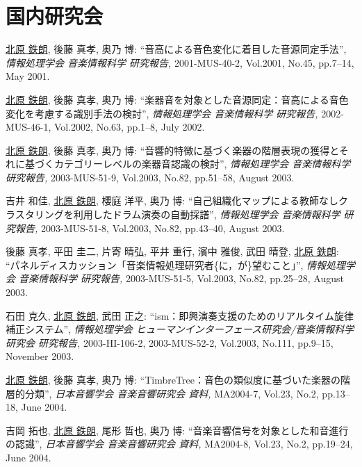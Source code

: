 \section*{国内研究会}
\begin{Enumerate}
  
\item 
\underline{北原 鉄朗}, 
後藤 真孝, 
奥乃 博: 
    ``音高による音色変化に着目した音源同定手法'', 
    {\it 情報処理学会 音楽情報科学 研究報告,} 2001-MUS-40-2, Vol.2001, No.45, pp.7--14, May 2001. 

\item 
\underline{北原 鉄朗}, 
後藤 真孝, 
奥乃 博: 
    ``楽器音を対象とした音源同定：音高による音色変化を考慮する識別手法の検討'', 
    {\it 情報処理学会 音楽情報科学 研究報告,} 2002-MUS-46-1, Vol.2002, No.63, pp.1--8, July 2002. 

\item 
\underline{北原 鉄朗}, 
後藤 真孝, 
奥乃 博: 
    ``音響的特徴に基づく楽器の階層表現の獲得とそれに基づくカテゴリーレベルの楽器音認識の検討'', 
    {\it 情報処理学会 音楽情報科学 研究報告,} 2003-MUS-51-9, Vol.2003, No.82, pp.51--58, August 2003. 

\item 
吉井 和佳, 
\underline{北原 鉄朗}, 
櫻庭 洋平, 
奥乃 博: 
    ``自己組織化マップによる教師なしクラスタリングを利用したドラム演奏の自動採譜'', 
    {\it 情報処理学会 音楽情報科学 研究報告,} 2003-MUS-51-8, Vol.2003, No.82, pp.43--40, August 2003. 

\item 
後藤 真孝, 
平田 圭二, 
片寄 晴弘, 
平井 重行, 
濱中 雅俊, 
武田 晴登, 
\underline{北原 鉄朗}: 
    ``パネルディスカッション「音楽情報処理研究者\{に，が\}望むこと」'', 
    {\it 情報処理学会 音楽情報科学 研究報告,} 2003-MUS-51-5, Vol.2003, No.82, pp.25--28, August 2003. 

\item 
石田 克久, 
\underline{北原 鉄朗}, 
武田 正之: 
    ``ism：即興演奏支援のためのリアルタイム旋律補正システム'', 
    {\it 情報処理学会 ヒューマンインターフェース研究会/音楽情報科学研究会 研究報告,
    } 2003-HI-106-2, 2003-MUS-52-2, Vol.2003, No.111, pp.9--15, November 2003. 

\item 
\underline{北原 鉄朗}, 
後藤 真孝, 
奥乃 博: 
    ``TimbreTree：音色の類似度に基づいた楽器の階層的分類'', 
    {\it 日本音響学会 音楽音響研究会 資料,
    } MA2004-7, Vol.23, No.2, pp.13--18, June 2004. 

\item 
吉岡 拓也, 
\underline{北原 鉄朗}, 
尾形 哲也, 
奥乃 博: 
    ``音楽音響信号を対象とした和音進行の認識'', 
    {\it 日本音響学会 音楽音響研究会 資料,
    } MA2004-8, Vol.23, No.2, pp.19--24, June 2004. 


\end{Enumerate}
